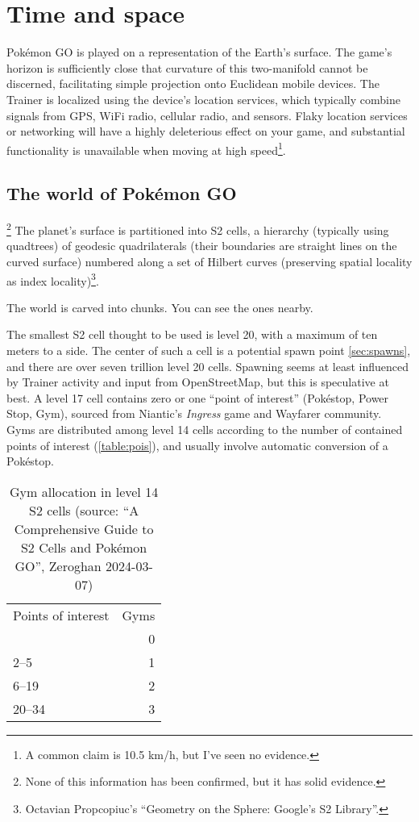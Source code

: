 \chapter{Time and space\label{chap:timespace}}
Pokémon GO is played on a representation of the Earth's surface.
The game's horizon is sufficiently close that curvature of this two-manifold
 cannot be discerned, facilitating simple projection onto Euclidean mobile devices.
The Trainer is localized using the device's location services, which typically
 combine signals from GPS, WiFi radio, cellular radio, and sensors.
Flaky location services or networking will have a highly deleterious effect on your game,
 and substantial functionality is unavailable when moving at high speed\footnote{A common
 claim is 10.5 km/h, but I've seen no evidence.}.

\section{The world of Pokémon GO\label{sec:world}}\footnote{None of this information has been confirmed, but it has solid evidence.}
The planet's surface is partitioned into S2 cells, a hierarchy (typically using
 quadtrees) of geodesic quadrilaterals (their boundaries are straight lines on the curved
 surface) numbered along a set of Hilbert curves (preserving spatial locality as index locality)\footnote{Octavian Propcopiuc's ``Geometry on the Sphere: Google's S2 Library''.}.
\begin{tipbox}[title=If that meant nothing to you…]
The world is carved into chunks. You can see the ones nearby.
\end{tipbox}
The smallest S2 cell thought to be used is level 20, with a maximum of ten meters to a side.
The center of such a cell is a potential spawn point \autoref{sec:spawns}, and there are over seven trillion level 20 cells.
Spawning seems at least influenced by Trainer activity and input from OpenStreetMap, but this is speculative at best.
A level 17 cell contains zero or one ``point of interest'' (Pokéstop, Power Stop, Gym),
 sourced from Niantic's \textit{Ingress} game and Wayfarer community.
Gyms are distributed among level 14 cells according to the number of contained points of interest (\autoref{table:pois}),
 and usually involve automatic conversion of a Pokéstop.
\begin{table}
\centering
\begin{tabular}{lr}
Points of interest & Gyms\\
\Midrule
1 & 0 \\
2--5 & 1\\
6--19 & 2\\
20--34 & 3\\
\end{tabular}
\caption[Gym allocation in level 14 S2 cells]{Gym allocation in level 14 S2 cells (source: ``A Comprehensive Guide to S2 Cells and Pokémon GO'', Zeroghan 2024-03-07)\label{table:pois}}
\end{table}
